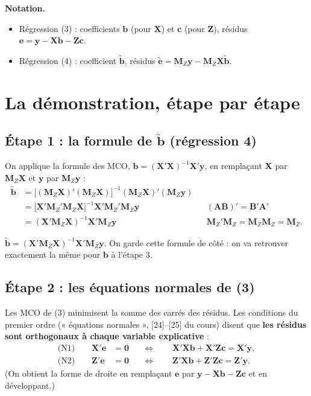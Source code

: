\documentclass[11pt,a4paper]{article}
\newcommand{\vy}{\mathbf{y}}\newcommand{\vX}{\mathbf{X}}\newcommand{\vZ}{\mathbf{Z}}
\newcommand{\ve}{\mathbf{e}}\newcommand{\vb}{\mathbf{b}}\newcommand{\vc}{\mathbf{c}}
\newcommand{\Mz}{\mathbf{M}_Z}\newcommand{\Pz}{\mathbf{P}_Z}
\begin{document}
\textbf{Notation.}
\begin{itemize}[nosep]
\item Régression (3) : coefficients $\vb$ (pour $\vX$) et $\vc$ (pour $\vZ$), résidus $\ve=\vy-\vX\vb-\vZ\vc$.
\item Régression (4) : coefficient $\tilde{\vb}$, résidus $\tilde{\ve}=\Mz\vy-\Mz\vX\tilde{\vb}$.
\end{itemize}

\section{La démonstration, étape par étape}

\subsection*{Étape 1 : la formule de $\tilde{\vb}$ (régression 4)}

On applique la formule des MCO, $\vb=(\vX'\vX)^{-1}\vX'\vy$, en remplaçant $\vX$ par $\Mz\vX$ et $\vy$ par $\Mz\vy$ :
\begin{align*}
\tilde{\vb}&=\big[(\Mz\vX)'(\Mz\vX)\big]^{-1}(\Mz\vX)'(\Mz\vy)\\
&=\big[\vX'\Mz'\Mz\vX\big]^{-1}\vX'\Mz'\Mz\vy && (\mathbf{AB})'=\mathbf B'\mathbf A'\\
&=(\vX'\Mz\vX)^{-1}\vX'\Mz\vy && \Mz'\Mz=\Mz\Mz=\Mz .
\end{align*}

\begin{resultat}
$\tilde{\vb}=(\vX'\Mz\vX)^{-1}\vX'\Mz\vy$. \quad On garde cette formule de côté : on va retrouver exactement la même pour $\vb$ à l'étape 3.
\end{resultat}

\subsection*{Étape 2 : les équations normales de (3)}

Les MCO de (3) minimisent la somme des carrés des résidus. Les conditions du premier ordre (« équations normales », [24]--[25] du cours) disent que \textbf{les résidus sont orthogonaux à chaque variable explicative} :
\begin{align*}
\text{(N1)}\qquad \vX'\ve&=\mathbf 0 &&\Longleftrightarrow\qquad \vX'\vX\vb+\vX'\vZ\vc=\vX'\vy,\\
\text{(N2)}\qquad \vZ'\ve&=\mathbf 0 &&\Longleftrightarrow\qquad \vZ'\vX\vb+\vZ'\vZ\vc=\vZ'\vy.
\end{align*}
(On obtient la forme de droite en remplaçant $\ve$ par $\vy-\vX\vb-\vZ\vc$ et en développant.)
\end{document}
